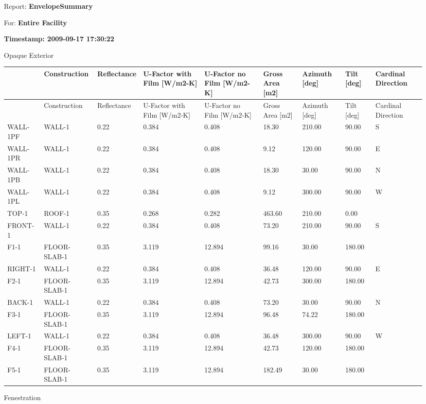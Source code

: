 Report: \textbf{EnvelopeSummary}

For: \textbf{Entire Facility}

\textbf{Timestamp: 2009-09-17 17:30:22}

Opaque Exterior

{\scriptsize
\begin{longtable}[c]{p{0.66in}p{0.66in}p{0.6in}p{0.6in}p{0.6in}p{0.6in}p{0.6in}p{0.6in}p{0.6in}}
\toprule 
~ & Construction & Reflectance & U-Factor with Film [W/m2-K] & U-Factor no Film [W/m2-K] & Gross Area [m2] & Azimuth [deg] & Tilt [deg] & Cardinal Direction \tabularnewline
\midrule
\endfirsthead

\toprule 
~ & Construction & Reflectance & U-Factor with Film [W/m2-K] & U-Factor no Film [W/m2-K] & Gross Area [m2] & Azimuth [deg] & Tilt [deg] & Cardinal Direction \tabularnewline
\midrule
\endhead

WALL-1PF & WALL-1 & 0.22 & 0.384 & 0.408 & 18.30 & 210.00 & 90.00 & S \tabularnewline
WALL-1PR & WALL-1 & 0.22 & 0.384 & 0.408 & 9.12 & 120.00 & 90.00 & E \tabularnewline
WALL-1PB & WALL-1 & 0.22 & 0.384 & 0.408 & 18.30 & 30.00 & 90.00 & N \tabularnewline
WALL-1PL & WALL-1 & 0.22 & 0.384 & 0.408 & 9.12 & 300.00 & 90.00 & W \tabularnewline
TOP-1 & ROOF-1 & 0.35 & 0.268 & 0.282 & 463.60 & 210.00 & 0.00 & ~ \tabularnewline
FRONT-1 & WALL-1 & 0.22 & 0.384 & 0.408 & 73.20 & 210.00 & 90.00 & S \tabularnewline
F1-1 & FLOOR-SLAB-1 & 0.35 & 3.119 & 12.894 & 99.16 & 30.00 & 180.00 & ~ \tabularnewline
RIGHT-1 & WALL-1 & 0.22 & 0.384 & 0.408 & 36.48 & 120.00 & 90.00 & E \tabularnewline
F2-1 & FLOOR-SLAB-1 & 0.35 & 3.119 & 12.894 & 42.73 & 300.00 & 180.00 & ~ \tabularnewline
BACK-1 & WALL-1 & 0.22 & 0.384 & 0.408 & 73.20 & 30.00 & 90.00 & N \tabularnewline
F3-1 & FLOOR-SLAB-1 & 0.35 & 3.119 & 12.894 & 96.48 & 74.22 & 180.00 & ~ \tabularnewline
LEFT-1 & WALL-1 & 0.22 & 0.384 & 0.408 & 36.48 & 300.00 & 90.00 & W \tabularnewline
F4-1 & FLOOR-SLAB-1 & 0.35 & 3.119 & 12.894 & 42.73 & 120.00 & 180.00 & ~ \tabularnewline
F5-1 & FLOOR-SLAB-1 & 0.35 & 3.119 & 12.894 & 182.49 & 30.00 & 180.00 & ~ \tabularnewline
\bottomrule
\end{longtable}}

Fenestration

